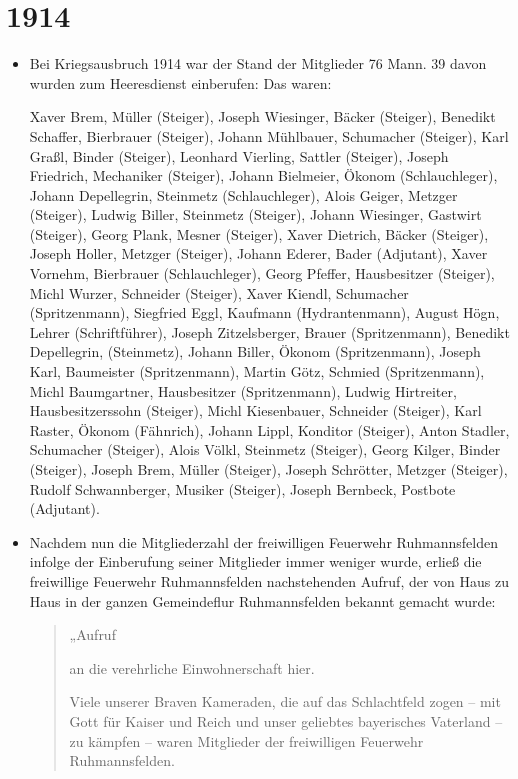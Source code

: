 \documentclass[12pt,a4paper]{book}
\begin{document}
\section*{1914}
\begin{itemize}

\item Bei Kriegsausbruch 1914 war der Stand der Mitglieder 76 Mann. 39
davon wurden zum Heeresdienst einberufen: Das waren:

Xaver Brem, Müller (Steiger), Joseph Wiesinger, Bäcker (Steiger),
Benedikt Schaffer, Bierbrauer (Steiger), Johann Mühlbauer, Schumacher
(Steiger), Karl Graßl, Binder (Steiger), Leonhard Vierling, Sattler
(Steiger), Joseph Friedrich, Mechaniker (Steiger), Johann Bielmeier,
Ökonom (Schlauchleger), Johann Depellegrin, Steinmetz (Schlauchleger),
Alois Geiger, Metzger (Steiger), Ludwig Biller, Steinmetz (Steiger),
Johann Wiesinger, Gastwirt (Steiger), Georg Plank, Mesner (Steiger),
Xaver Dietrich, Bäcker (Steiger), Joseph Holler, Metzger (Steiger),
Johann Ederer, Bader (Adjutant), Xaver Vornehm, Bierbrauer
(Schlauchleger), Georg Pfeffer, Hausbesitzer (Steiger), Michl Wurzer,
Schneider (Steiger), Xaver Kiendl, Schumacher (Spritzenmann), Siegfried
Eggl, Kaufmann (Hydrantenmann), August Högn, Lehrer (Schriftführer),
Joseph Zitzelsberger, Brauer (Spritzenmann), Benedikt Depellegrin,
(Steinmetz), Johann Biller, Ökonom (Spritzenmann), Joseph Karl,
Baumeister (Spritzenmann), Martin Götz, Schmied (Spritzenmann), Michl
Baumgartner, Hausbesitzer (Spritzenmann), Ludwig Hirtreiter,
Hausbesitzerssohn (Steiger), Michl Kiesenbauer, Schneider (Steiger),
Karl Raster, Ökonom (Fähnrich), Johann Lippl, Konditor (Steiger), Anton
Stadler, Schumacher (Steiger), Alois Völkl, Steinmetz (Steiger), Georg
Kilger, Binder (Steiger), Joseph Brem, Müller (Steiger), Joseph
Schrötter, Metzger (Steiger), Rudolf Schwannberger, Musiker (Steiger),
Joseph Bernbeck, Postbote (Adjutant).

\item Nachdem nun die Mitgliederzahl der freiwilligen Feuerwehr
Ruhmannsfelden infolge der Einberufung seiner Mitglieder immer weniger
wurde, erließ die freiwillige Feuerwehr Ruhmannsfelden nachstehenden
Aufruf, der von Haus zu Haus in der ganzen Gemeindeflur Ruhmannsfelden
bekannt gemacht wurde:

\begin{quote}
„Aufruf

an die verehrliche Einwohnerschaft hier.

Viele unserer Braven Kameraden, die auf das Schlachtfeld zogen – mit
Gott für Kaiser und Reich und unser geliebtes bayerisches Vaterland – zu
kämpfen – waren Mitglieder der freiwilligen Feuerwehr Ruhmannsfelden.


\end{quote}
\end{itemize}
\end{document}
